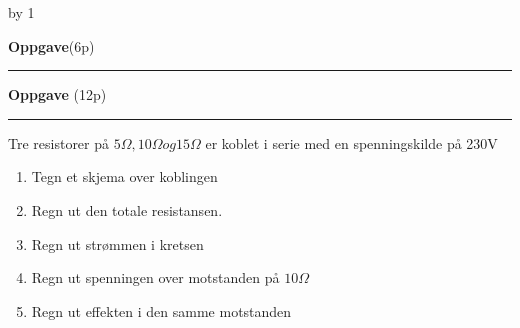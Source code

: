 \documentclass[12pt,a4paper]{article}
\def\oppgave{
            \advance\questnum by 1
	    \ifthenelse{\questnum>0\AND \questnum<9}
	    {
                \vskip 1cm
		\textbf{Oppgave}\hskip 5pt\the\questnum \hfill \hfill(6p)
		\vskip 3pt
		\hrule
	\vskip 0.5cm}
	{
                \vskip 1cm
		\textbf{Oppgave}\hskip 5pt \the\questnum \hfill \hfill(12p)
		\vskip 3pt \hrule \vskip 0.5cm }

		}
\begin{document}
\vskip 5pt 
\vskip 2.5pt 
\newpage
\oppgave{}%
\vskip 2.5pt 
Tre resistorer på $5\Omega, 10\Omega og 15\Omega$ er koblet i serie med en spenningskilde på 230V
\begin{enumerate}
	\item Tegn et skjema over koblingen
	\item Regn ut den totale resistansen. 
	\item Regn ut strømmen i kretsen
	\item Regn ut spenningen over motstanden på $10\Omega$
	\item Regn ut effekten i den samme motstanden
\end{enumerate}
\vskip 5pt 
\vskip 2.5pt 
\newpage
\end{document}
